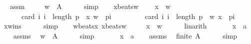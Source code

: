 \begin{isabellebody}
\ \isamarkupfalse%
\ assm\ \isamarkupfalse%
\isanewline
\ \ \ \ {\isachardoublequoteopen}w\ {\isasymin}\ A{\isachardoublequoteclose}\isanewline
\ \ \ \ \isamarkupfalse%
\ simp\isanewline
\ \ \isamarkupfalse%
\ x{\isacharunderscore}{\kern0pt}beats{\isacharunderscore}{\kern0pt}w{\isacharcolon}{\kern0pt}\isanewline
\ \ \ \ {\isachardoublequoteopen}x\ {\isasymnoteq}\ w\ {\isasymLongrightarrow}\isanewline
\ \ \ \ \ \ card\ {\isacharbraceleft}{\kern0pt}i{\isachardot}{\kern0pt}\ i\ {\isacharless}{\kern0pt}\ length\ p\ {\isasymand}\ {\isacharparenleft}{\kern0pt}x{\isacharcomma}{\kern0pt}\ w{\isacharparenright}{\kern0pt}\ {\isasymin}\ p{\isacharbang}{\kern0pt}i{\isacharbraceright}{\kern0pt}\ {\isacharless}{\kern0pt}\isanewline
\ \ \ \ \ \ \ \ card\ {\isacharbraceleft}{\kern0pt}i{\isachardot}{\kern0pt}\ i\ {\isacharless}{\kern0pt}\ length\ p\ {\isasymand}\ {\isacharparenleft}{\kern0pt}w{\isacharcomma}{\kern0pt}\ x{\isacharparenright}{\kern0pt}\ {\isasymin}\ p{\isacharbang}{\kern0pt}i{\isacharbraceright}{\kern0pt}{\isachardoublequoteclose}\isanewline
\ \ \ \ \isamarkupfalse%
\ x{\isacharunderscore}{\kern0pt}wins\isanewline
\ \ \ \ \isamarkupfalse%
\ simp\isanewline
\ \ \isamarkupfalse%
\ w{\isacharunderscore}{\kern0pt}beats{\isacharunderscore}{\kern0pt}x\ x{\isacharunderscore}{\kern0pt}beats{\isacharunderscore}{\kern0pt}w\ \isamarkupfalse%
\isanewline
\ \ \ \ {\isachardoublequoteopen}x\ {\isacharequal}{\kern0pt}\ w{\isachardoublequoteclose}\isanewline
\ \ \ \ \isamarkupfalse%
\ linarith\isanewline
{}\isamarkupfalse%
\isanewline
\ \ \isamarkupfalse%
\isanewline
\ \ \ \ x\ {\isacharcolon}{\kern0pt}{\isacharcolon}{\kern0pt}\ {\isachardoublequoteopen}{\isacharprime}{\kern0pt}a{\isachardoublequoteclose}\isanewline
\ \ \isamarkupfalse%
\ assms\ \isamarkupfalse%
\ {\isachardoublequoteopen}w\ {\isasymin}\ A{\isachardoublequoteclose}\isanewline
\ \ \ \ \isamarkupfalse%
\ simp\isanewline
{}\isamarkupfalse%
\isanewline
\ \ \isamarkupfalse%
\isanewline
\ \ \ \ x\ {\isacharcolon}{\kern0pt}{\isacharcolon}{\kern0pt}\ {\isachardoublequoteopen}{\isacharprime}{\kern0pt}a{\isachardoublequoteclose}\isanewline
\ \ \isamarkupfalse%
\ assms\ \isamarkupfalse%
\ {\isachardoublequoteopen}finite\ A{\isachardoublequoteclose}\isanewline
\ \ \ \ \isamarkupfalse%
\ simp\isanewline
{}\isamarkupfalse%

\end{isabellebody}
